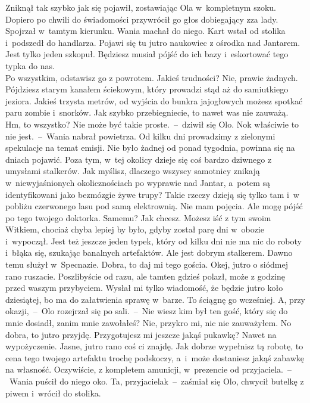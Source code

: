 \documentclass[../MAIN.tex]{subfiles}
\begin{document}
\qm
Zniknął tak szybko jak się pojawił, zostawiając Ola w~kompletnym szoku. Dopiero po chwili do świadomości przywrócił go głos dobiegający zza lady. Spojrzał w~tamtym kierunku. Wania machał do niego. Kart wstał od stolika i~podszedł do handlarza.
\sx Pojawi się tu jutro naukowiec z ośrodka nad Jantarem. Jest tylko jeden szkopuł. Będziesz musiał pójść do ich bazy i~eskortować tego typka do nas.\\
Po wszystkim, odstawisz go z powrotem.
\xx Jakieś trudności?
\xx Nie, prawie żadnych. Pójdziesz starym kanałem ściekowym, który prowadzi stąd aż do samiutkiego jeziora. Jakieś trzysta metrów, od wyjścia do bunkra jajogłowych możesz spotkać paru zombie i~snorków. Jak szybko przebiegniecie, to nawet was nie zauważą.
\xx Hm, to wszystko? Nie może być takie proste.~--~dziwił się Olo.
\xx No\3k właściwie to nie jest.~--~Wania nabrał powietrza. \xx Od kilku dni prowadzimy z zielonymi spekulacje na temat emisji. Nie było żadnej od ponad tygodnia, powinna się na dniach pojawić. Poza tym, w~tej okolicy dzieje się coś bardzo dziwnego z umysłami stalkerów. Jak myślisz, dlaczego wszyscy samotnicy znikają w~niewyjaśnionych okolicznościach po wyprawie nad Jantar, a~potem są identyfikowani jako bezmózgie żywe trupy? Takie rzeczy dzieją się tylko tam i~w pobliżu czerwonego lasu pod samą elektrownią.
\xx Nie mam pojęcia. Ale mogę pójść po tego twojego doktorka. Samemu?
\xx Jak chcesz. Możesz iść z tym swoim Witkiem, chociaż chyba lepiej by było, gdyby został parę dni w~obozie i~wypoczął. Jest też jeszcze jeden typek, który od kilku dni nie ma nic do roboty i~błąka się, szukając banalnych artefaktów. Ale jest dobrym stalkerem. Dawno temu służył w~Specnazie.
\xx Dobra, to daj mi tego gościa.
\xx Okej, jutro o siódmej rano ruszacie. Poszlibyście od razu, ale tamten gdzieś polazł, może z godzinę przed waszym przybyciem. Wysłał mi tylko wiadomość, że będzie jutro koło dziesiątej, bo ma do załatwienia sprawę w~barze. To ściągnę go wcześniej.
\xx A, przy okazji,~--~Olo rozejrzał się po sali.~--~Nie wiesz kim był ten gość, który się do mnie dosiadł, zanim mnie zawołałeś?
\xx Nie, przykro mi, nic nie zauważyłem.
\xx No dobra, to jutro przyjdę. Przygotujesz mi jeszcze jakąś pukawkę? Nawet na wypożyczenie.
\xx Jasne, jutro rano coś ci znajdę. Jak dobrze wypełnisz tą robotę, to cena tego twojego artefaktu trochę podskoczy, a~i~może dostaniesz jakąś zabawkę na własność. Oczywiście, z kompletem amunicji, w~prezencie od przyjaciela.~--~Wania puścił do niego oko.
\xx Ta, przyjaciela\3k~--~zaśmiał się Olo, chwycił butelkę z piwem i~wrócił do stolika.
\qm
\end{document}
